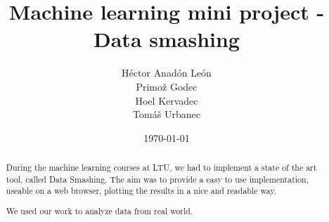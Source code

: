 \documentclass[a4paper]{article}
\title{Machine learning mini project - Data smashing}
\author
{
	Héctor {\sc Anadón León}\\
    Primož {\sc Godec}\\
    Hoel {\sc Kervadec}\\
    Tomáš {\sc Urbanec}
}
\date{\today}
\begin{document}
    \maketitle

    \begin{abstract}
        During the machine learning courses at LTU, we had to implement a state of the art tool, called Data Smashing. The aim was to provide a easy to use implementation, useable on a web browser, plotting the results in a nice and readable way.

        We used our work to analyze data from real world.
    \end{abstract}
    
    \tableofcontents
    \setlength{\parskip}{10pt}
    
    

    

    

    

    

    
    
\end{document}
